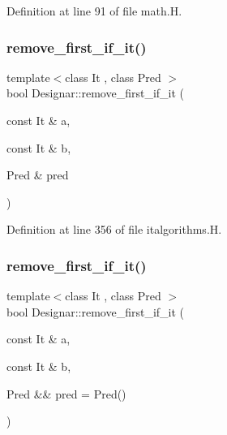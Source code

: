 Definition at line 91 of file math.\+H.

\mbox{\label{namespace_designar_ab732236488ace0492a1cf5fd7ce9add9}} 
\subsubsection{\texorpdfstring{remove\+\_\+first\+\_\+if\+\_\+it()}{remove\_first\_if\_it()}\hspace{0.1cm}{\footnotesize\ttfamily [1/2]}}
{\footnotesize\ttfamily template$<$class It , class Pred $>$ \\
bool Designar\+::remove\+\_\+first\+\_\+if\+\_\+it (\begin{DoxyParamCaption}\item[{const It \&}]{a,  }\item[{const It \&}]{b,  }\item[{Pred \&}]{pred }\end{DoxyParamCaption})}



Definition at line 356 of file italgorithms.\+H.

\mbox{\label{namespace_designar_aaee4724db923890d1f8a85009922805f}} 
\subsubsection{\texorpdfstring{remove\+\_\+first\+\_\+if\+\_\+it()}{remove\_first\_if\_it()}\hspace{0.1cm}{\footnotesize\ttfamily [2/2]}}
{\footnotesize\ttfamily template$<$class It , class Pred $>$ \\
bool Designar\+::remove\+\_\+first\+\_\+if\+\_\+it (\begin{DoxyParamCaption}\item[{const It \&}]{a,  }\item[{const It \&}]{b,  }\item[{Pred \&\&}]{pred = {\ttfamily Pred()} }\end{DoxyParamCaption})}



